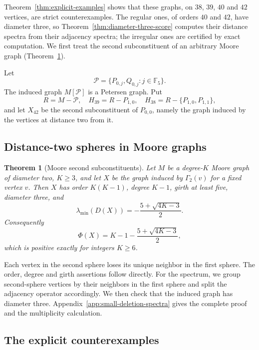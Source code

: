 \documentclass[a4paper,10pt,reqno]{amsart}
\theoremstyle{plain}
\newtheorem{theorem}{Theorem}[section]
\theoremstyle{definition}
\theoremstyle{remark}
\newcommand{\F}{\mathbb F_5}
\begin{document}
Theorem~\ref{thm:explicit-examples} shows that these graphs, on \(38\),
\(39\), \(40\) and \(42\) vertices, are strict counterexamples. The regular
ones, of orders \(40\) and \(42\), have diameter three, so
Theorem~\ref{thm:diameter-three-score} computes their distance spectra from
their adjacency spectra; the irregular ones are certified by exact
computation. We first treat the second subconstituent of an arbitrary Moore
graph (Theorem~\ref{thm:second-subconstituent}).

Let
\[
 \mathcal P=\{P_{0,j},Q_{0,j}:j\in\F\}.
\]
The induced graph \(M[\mathcal P]\) is a Petersen graph.  Put
\[
 R=M-\mathcal P,
 \quad H_{39}=R-P_{1,0},
 \quad H_{38}=R-\{P_{1,0},P_{1,1}\},
\]
and let \(X_{42}\) be the second subconstituent of \(P_{0,0}\), namely the
graph induced by the vertices at distance two from it.

\subsection{Distance-two spheres in Moore graphs}

\begin{theorem}[Moore second subconstituents]\label{thm:second-subconstituent}
Let \(M\) be a degree-\(K\) Moore graph of diameter two, \(K\ge3\), and let
\(X\) be the graph induced by \(\Gamma_2(v)\) for a fixed vertex \(v\).  Then
\(X\) has order \(K(K-1)\), degree \(K-1\), girth at least five, diameter
three, and
\[
 \lambda_{\min}(D(X))=-\frac{5+\sqrt{4K-3}}2.
\]
Consequently
\[
 \Phi(X)=K-1-\frac{5+\sqrt{4K-3}}2,
\]
which is positive exactly for integers \(K\ge6\).
\end{theorem}

Each vertex in the second sphere loses its unique neighbor in the
first sphere. The order, degree and girth assertions follow directly.
For the spectrum, we group second-sphere vertices by their neighbors in
the first sphere and split the adjacency operator accordingly. We then
check that the induced graph has diameter three.  Appendix~\ref{app:small-deletion-spectra} gives the complete proof and
the multiplicity calculation.

\subsection{The explicit counterexamples}
\end{document}

